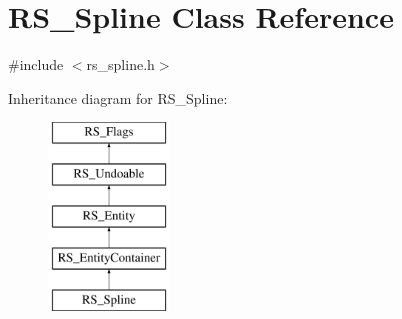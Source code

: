 \hypertarget{classRS__Spline}{\section{R\-S\-\_\-\-Spline Class Reference}
\label{classRS__Spline}
}


{\ttfamily \#include $<$rs\-\_\-spline.\-h$>$}

Inheritance diagram for R\-S\-\_\-\-Spline\-:\begin{figure}[H]
\begin{center}
\leavevmode
\includegraphics[height=5.000000cm]{classRS__Spline}
\end{center}
\end{figure}
